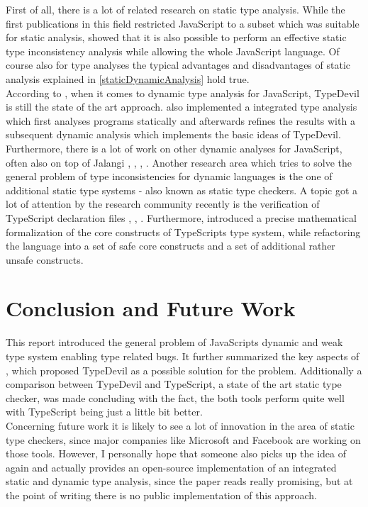 \documentclass[runningheads,a4paper]{llncs}
\begin{document}
First of all, there is a lot of related research on static type analysis.
While the first publications in this field restricted JavaScript to a subset which was suitable for static analysis, \cite{DBLP:conf/sas/JensenMT09} showed that it is also possible to perform an effective static type inconsistency analysis while allowing the whole JavaScript language.
Of course also for type analyses the typical advantages and disadvantages of static analysis explained in \ref{staticDynamicAnalysis} hold true.\\
According to \cite{DBLP:conf/icse/TanXCLYS17}, when it comes to dynamic type analysis for JavaScript, TypeDevil is still the state of the art approach. 
\cite{DBLP:conf/icse/TanXCLYS17} also implemented a integrated type analysis which first analyses programs statically and afterwards refines the results with a subsequent dynamic analysis which implements the basic ideas of TypeDevil.
Furthermore, there is a lot of work on other dynamic analyses for JavaScript, often also on top of Jalangi \cite{DBLP:phd/basesearch/Austin13}, \cite{DBLP:conf/issta/GongPSS15}, \cite{DBLP:conf/sigsoft/GongPS15}, \cite{DBLP:conf/sigsoft/JensenSSC15}.
Another research area which tries to solve the general problem of type inconsistencies for dynamic languages is the one of additional static type systems - also known as static type checkers.
A topic got a lot of attention by the research community recently is the verification of TypeScript declaration files \cite{DBLP:conf/fase/KristensenM17}, \cite{DBLP:conf/ecoop/WilliamsMWZ17}, \cite{DBLP:journals/pacmpl/KristensenM17}.
Furthermore, \cite{DBLP:conf/ecoop/BiermanAT14} introduced a precise mathematical formalization of the core constructs of TypeScripts type system, while refactoring the language into a set of safe core constructs and a set of additional rather unsafe constructs.


\section{Conclusion and Future Work}
This report introduced the general problem of JavaScripts dynamic and weak type system enabling type related bugs.
It further summarized the key aspects of \cite{DBLP:conf/icse/PradelSS15}, which proposed TypeDevil as a possible solution for the problem.
Additionally a comparison between TypeDevil and TypeScript, a state of the art static type checker, was made concluding with the fact, the both tools perform quite well with TypeScript being just a little bit better.\\
Concerning future work it is likely to see a lot of innovation in the area of static type checkers, since major companies like Microsoft and Facebook are working on those tools.
However, I personally hope that someone also picks up the idea of \cite{DBLP:conf/icse/TanXCLYS17} again and actually provides an open-source implementation of an integrated static and dynamic type analysis, since the paper reads really promising, but at the point of writing there is no public implementation of this approach.  
\end{document}
